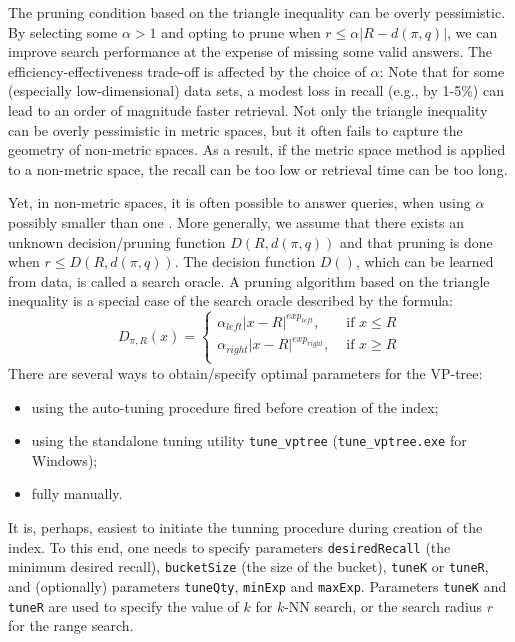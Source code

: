 \documentclass[runningheads,a4paper]{llncs}
\newcommand{\ttt}[1]{\texttt{#1}}
\newcommand{\knn}{$k$-NN }
\begin{document}
{The pruning condition based on the triangle inequality can be overly pessimistic.
By selecting some $\alpha > 1$ and opting to prune when $r \le \alpha |R - d(\pi, q)|$,
we can improve search performance at the expense of missing some valid answers.
The efficiency-effectiveness trade-off is affected by the choice of $\alpha$:
Note that for some (especially low-dimensional) data sets, a modest
loss in recall (e.g., by 1-5\%) can lead to an order of magnitude faster retrieval.
Not only the triangle inequality can be overly pessimistic in metric spaces, 
but it often fails to capture the geometry of non-metric spaces.
As a result, if the metric space method is applied to a non-metric space,
the recall can be too low or retrieval time can be too long.

Yet, in non-metric spaces, 
it is often possible to answer queries, 
when using $\alpha$ possibly smaller than one \cite{Boytsov_and_Bilegsaikhan:nips2013,naidan2015permutation}.
More generally, we assume that there exists an unknown decision/pruning function $D(R, d(\pi, q))$ and
that pruning is done when $r \le D(R, d(\pi, q))$.
The decision function $D()$, which can be learned from data, is called a search oracle.
A pruning algorithm based on the triangle inequality 
is a special case of the search oracle described by the formula:
\begin{equation}\label{EqDecFunc}
D_{\pi,R}(x) = \left\{
\begin{array}{ll}
\alpha_{left} |x - R|^{{exp}_{left}},  & \mbox{ if }x \le R\\
\alpha_{right} |x - R|^{{exp}_{right}}, & \mbox{ if }x \ge R\\
\end{array}
\right.
\end{equation}
There are several ways to obtain/specify optimal parameters for the VP-tree: 
\begin{itemize} 
\item using the auto-tuning procedure fired before creation of the index; 
\item using the standalone tuning utility \texttt{tune\_vptree} (\texttt{tune\_vptree.exe} for Windows);
\item fully manually.
\end{itemize}


It is, perhaps, easiest to initiate the tunning procedure during creation of the index.
To this end, one needs to specify parameters \texttt{desiredRecall} (the minimum desired recall), \texttt{bucketSize} (the size 
of the bucket), \texttt{tuneK} or \texttt{tuneR}, and (optionally) parameters \texttt{tuneQty}, \ttt{minExp} and \ttt{maxExp}. 
Parameters \texttt{tuneK} and \texttt{tuneR} are used to specify the value of $k$ for \knn search,
or the search radius $r$ for the range search.

}
\end{document}
